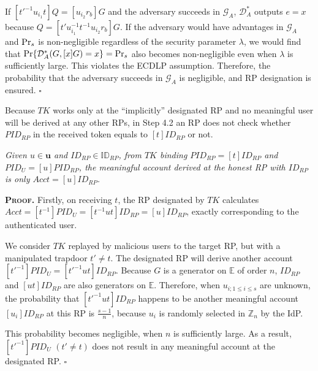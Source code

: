 If $[t'^{-1}u_{i_1}t]Q = [u_{i_2}r_{b}]G$ and the adversary succeeds in $\mathcal{G}_A$, $\mathcal{D}^*_A$ outputs $e =x$
 because $Q = [t'u_{i_1}^{-1}t^{-1}u_{i_2}r_{b}]G$.
If the adversary would have advantages  in $\mathcal{G}_A$ and ${\rm Pr}_s$ is non-negligible regardless of the security parameter $\lambda$,
    we would find that ${\rm Pr}\{\mathcal{D}^*_A(G, [x]G)=x\}= {\rm Pr}_s$ also becomes non-negligible even when $\lambda$ is sufficiently large.
This violates the ECDLP assumption.
Therefore, the probability that the adversary succeeds in $\mathcal{G}_A$ is negligible,
    and RP designation is ensured.
\hfill $\square$
\vspace{.75mm}

Because $TK$ works only at the ``implicitly'' designated RP and
    no meaningful user will be derived at any other RPs, %
 in Step 4.2 an RP does not check whether $PID_{RP}$ in the received token equals to $[t]ID_{RP}$ or not.


\vspace{-1.2mm}
\begin{thm} \emph{Given $u \in \mathbf{u}$ and $ID_{RP} \in \mathbb{ID}_{RP}$,
from $TK$ binding $PID_{RP}=[t]ID_{RP}$ and $PID_U = [u]PID_{RP}$,
 the meaningful account derived at the honest RP with $ID_{RP}$ 
 is only $Acct = [u]ID_{RP}$.}\label{thm-user-id}
\end{thm}
\vspace{-1.2mm}

\noindent\textbf{\textsc{Proof.}}
Firstly, on receiving $t$,
the RP designated by $TK$ calculates $Acct = [t^{-1}]PID_{U} =[t^{-1}ut]ID_{RP} = [u]ID_{RP}$,
    exactly corresponding to the authenticated user.

We consider $TK$ replayed by malicious users to the target RP, but with a manipulated trapdoor $t' \neq t$.
The designated RP will derive another account $[t'^{-1}]PID_U = [t'^{-1}ut]ID_{RP}$.
Because $G$ is a generator on $\mathbb{E}$ of order $n$, $ID_{RP}$ and $[ut]ID_{RP}$ are also generators on $\mathbb{E}$.
Therefore, when $u_{i; 1\leq i \leq s}$ are unknown, the probability that $[t'^{-1}ut]ID_{RP}$ happens to be another meaningful account $[u_i]ID_{RP}$ at this RP is $\frac{s-1}{n}$,
because $u_i$ is randomly selected in $\mathbb{Z}_n$ by the IdP.

This probability becomes negligible, when $n$ is sufficiently large.
As a result, $[t'^{-1}]PID_U$ $(t' \neq t)$ does not result in any meaningful account at the designated RP. 
\hfill $\square$

